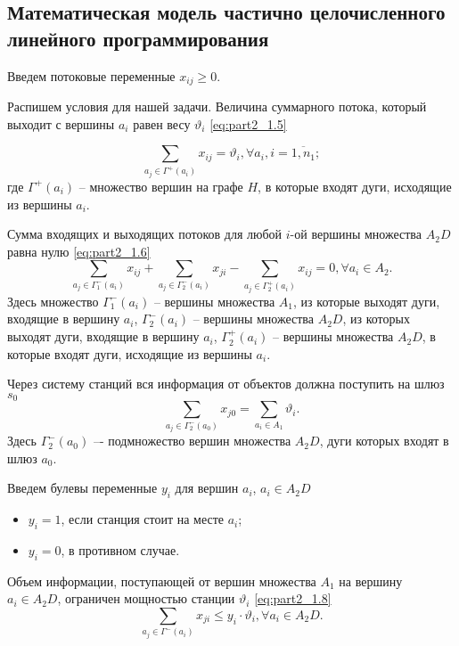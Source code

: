\subsection{Математическая модель частично целочисленного линейного программирования}

Введем потоковые переменные $x_{ij} \geqslant 0$.

Распишем условия для нашей задачи.
Величина суммарного потока, который выходит с вершины $a_i$ равен весу $\vartheta_i$ \cref{eq:part2_1.5}

\begin{equation}\label{eq:part2_1.5}
    \sum_{a_j \in \Gamma^+(a_i)} x_{ij} = \vartheta_i, \forall a_i, i =\overline{1, n_1};
\end{equation} 
где $\Gamma^+(a_i)$ -- множество вершин на графе $H$, в которые входят дуги, исходящие из вершины $a_i$.

Сумма входящих и выходящих потоков для любой $i$-ой вершины множества $A_2D$ равна нулю \cref{eq:part2_1.6}
\begin{equation}\label{eq:part2_1.6}
    \sum_{a_j \in \Gamma_1^-(a_i)} x_{ij} + \sum_{a_j \in \Gamma_2^-(a_i)} x_{ji} -  \sum_{a_j \in \Gamma_2^+(a_i)} x_{ij} =0 ,\forall a_i \in A_2. 
\end{equation} 
Здесь множество $\Gamma_1^-(a_i)$ -- вершины множества $A_1$, из которые выходят дуги, входящие в вершину $a_i$, $\Gamma_2^-(a_i)$ -- вершины множества $A_2D$, из которых выходят дуги, входящие в  вершину $a_i$, $\Gamma_2^+(a_i)$ -- вершины множества $A_2D$, в которые входят дуги, исходящие из вершины  $a_i$.

Через систему станций вся информация от объектов  должна поступить на шлюз $s_0$ 
\begin{equation}\label{eq:part2_1.7}
    \sum_{a_j \in \Gamma_2^-(a_0)} x_{j0} = \sum_{a_i \in A_1} \vartheta_i.
\end{equation}
Здесь $\Gamma_2^-(a_0)$ –- подмножество вершин множества $A_2D$, дуги которых входят в шлюз $a_0$.

Введем булевы переменные $y_i$ для вершин $a_i$, $a_i \in A_2D$
\begin{itemize}
    \item $y_i = 1$, если станция стоит на месте $a_i$;
    \item $y_i = 0$, в противном случае.
\end{itemize}

Объем информации, поступающей от вершин множества $A_1$ на вершину $a_i \in A_2D$, ограничен мощностью станции $\vartheta_i$ \cref{eq:part2_1.8}
\begin{equation}\label{eq:part2_1.8}
    \sum_{a_j \in \Gamma^-(a_i)} x_{ji} \leqslant y_i \cdot \vartheta_i, \forall a_i \in A_2D.
\end{equation}

